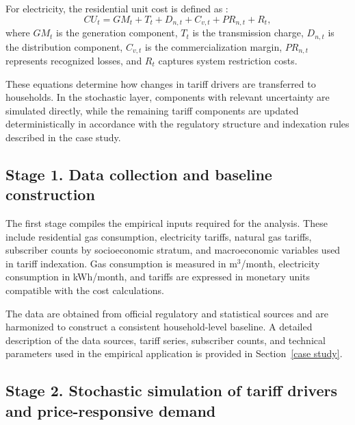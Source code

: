 \documentclass[authoryear,preprint,review,10pt]{elsarticle}
\begin{document}
For electricity, the residential unit cost is defined as \citep{CREG119_2007}:
\begin{equation}
CU_t = GM_t + T_t + D_{n,t} + C_{v,t} + PR_{n,t} + R_t,
\label{eq:elec_tariff_method}
\end{equation}
where $GM_t$ is the generation component, $T_t$ is the transmission charge, $D_{n,t}$ is the distribution component, $C_{v,t}$ is the commercialization margin, $PR_{n,t}$ represents recognized losses, and $R_t$ captures system restriction costs.

These equations determine how changes in tariff drivers are transferred to households. In the stochastic layer, components with relevant uncertainty are simulated directly, while the remaining tariff components are updated deterministically in accordance with the regulatory structure and indexation rules described in the case study.

\subsection{Stage 1. Data collection and baseline construction}
\label{sec:data_collection}

The first stage compiles the empirical inputs required for the analysis. These include residential gas consumption, electricity tariffs, natural gas tariffs, subscriber counts by socioeconomic stratum, and macroeconomic variables used in tariff indexation. Gas consumption is measured in m$^3$/month, electricity consumption in kWh/month, and tariffs are expressed in monetary units compatible with the cost calculations.

The data are obtained from official regulatory and statistical sources and are harmonized to construct a consistent household-level baseline. A detailed description of the data sources, tariff series, subscriber counts, and technical parameters used in the empirical application is provided in Section~\ref{case study}.

\subsection{Stage 2. Stochastic simulation of tariff drivers and price-responsive demand}
\label{sec:variable_simulation}
\end{document}
